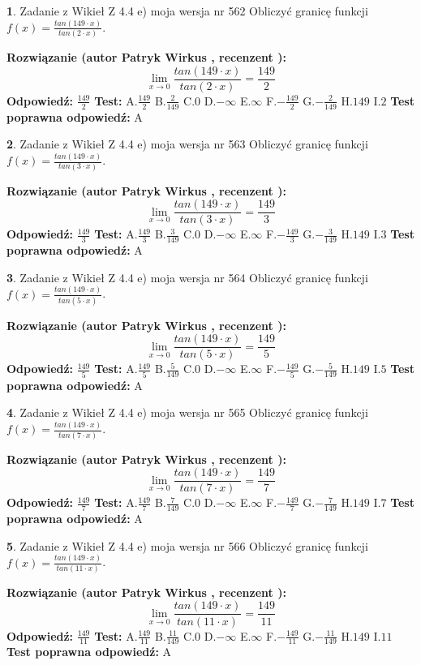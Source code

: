 \documentclass[12pt, a4paper]{article}
\theoremstyle{definition} %
\newtheorem{zad}{}
\newcommand{\zadStart}[1]{\begin{zad}#1\newline}
\newcommand{\zadStop}{\end{zad}}
\newcommand{\rozwStart}[2]{\noindent \textbf{Rozwiązanie (autor #1 , recenzent #2): }\newline}
\newcommand{\rozwStop}{\newline}
\newcommand{\odpStart}{\noindent \textbf{Odpowiedź:}\newline}
\newcommand{\odpStop}{\newline}
\newcommand{\testStart}{\noindent \textbf{Test:}\newline}
\newcommand{\testStop}{\newline}
\newcommand{\kluczStart}{\noindent \textbf{Test poprawna odpowiedź:}\newline}
\newcommand{\kluczStop}{\newline}
\begin{document}
\zadStart{Zadanie z Wikieł Z 4.4 e) moja wersja nr 562}
Obliczyć granicę funkcji $f(x)=\frac{tan(149\cdot x)}{tan(2\cdot x)}$.
\zadStop
\rozwStart{Patryk Wirkus}{}
$$\lim\limits_{x\to 0}\frac{tan(149\cdot x)}{tan(2\cdot x)}=
\frac{149}{2}$$
\rozwStop
\odpStart
$\frac{149}{2}$
\odpStop
\testStart
A.$\frac{149}{2}$
B.$\frac{2}{149}$
C.$0$
D.$-\infty$
E.$\infty$
F.$-\frac{149}{2}$
G.$-\frac{2}{149}$
H.$149$
I.$2$
\testStop
\kluczStart
A
\kluczStop



\zadStart{Zadanie z Wikieł Z 4.4 e) moja wersja nr 563}
Obliczyć granicę funkcji $f(x)=\frac{tan(149\cdot x)}{tan(3\cdot x)}$.
\zadStop
\rozwStart{Patryk Wirkus}{}
$$\lim\limits_{x\to 0}\frac{tan(149\cdot x)}{tan(3\cdot x)}=
\frac{149}{3}$$
\rozwStop
\odpStart
$\frac{149}{3}$
\odpStop
\testStart
A.$\frac{149}{3}$
B.$\frac{3}{149}$
C.$0$
D.$-\infty$
E.$\infty$
F.$-\frac{149}{3}$
G.$-\frac{3}{149}$
H.$149$
I.$3$
\testStop
\kluczStart
A
\kluczStop



\zadStart{Zadanie z Wikieł Z 4.4 e) moja wersja nr 564}
Obliczyć granicę funkcji $f(x)=\frac{tan(149\cdot x)}{tan(5\cdot x)}$.
\zadStop
\rozwStart{Patryk Wirkus}{}
$$\lim\limits_{x\to 0}\frac{tan(149\cdot x)}{tan(5\cdot x)}=
\frac{149}{5}$$
\rozwStop
\odpStart
$\frac{149}{5}$
\odpStop
\testStart
A.$\frac{149}{5}$
B.$\frac{5}{149}$
C.$0$
D.$-\infty$
E.$\infty$
F.$-\frac{149}{5}$
G.$-\frac{5}{149}$
H.$149$
I.$5$
\testStop
\kluczStart
A
\kluczStop



\zadStart{Zadanie z Wikieł Z 4.4 e) moja wersja nr 565}
Obliczyć granicę funkcji $f(x)=\frac{tan(149\cdot x)}{tan(7\cdot x)}$.
\zadStop
\rozwStart{Patryk Wirkus}{}
$$\lim\limits_{x\to 0}\frac{tan(149\cdot x)}{tan(7\cdot x)}=
\frac{149}{7}$$
\rozwStop
\odpStart
$\frac{149}{7}$
\odpStop
\testStart
A.$\frac{149}{7}$
B.$\frac{7}{149}$
C.$0$
D.$-\infty$
E.$\infty$
F.$-\frac{149}{7}$
G.$-\frac{7}{149}$
H.$149$
I.$7$
\testStop
\kluczStart
A
\kluczStop



\zadStart{Zadanie z Wikieł Z 4.4 e) moja wersja nr 566}
Obliczyć granicę funkcji $f(x)=\frac{tan(149\cdot x)}{tan(11\cdot x)}$.
\zadStop
\rozwStart{Patryk Wirkus}{}
$$\lim\limits_{x\to 0}\frac{tan(149\cdot x)}{tan(11\cdot x)}=
\frac{149}{11}$$
\rozwStop
\odpStart
$\frac{149}{11}$
\odpStop
\testStart
A.$\frac{149}{11}$
B.$\frac{11}{149}$
C.$0$
D.$-\infty$
E.$\infty$
F.$-\frac{149}{11}$
G.$-\frac{11}{149}$
H.$149$
I.$11$
\testStop
\kluczStart
A
\kluczStop
\end{document}
